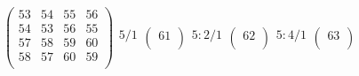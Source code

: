 \documentclass[12pt,a4paper]{amsart}
\begin{document}
\begin{align*}
\begin{array}{r}
\end{array}%
\left(\begin{array}{rr|rr}%
53&54&55&56\\%
54&53&56&55\\\hline%
57&58&59&60\\%
58&57&60&59\\%
\end{array}\right)%
\begin{array}{r}%
5/1 \\%
\end{array}%
\left(\begin{array}{r}%
61\\%
\end{array}\right)%
\begin{array}{r}%
5:2/1\\%
\end{array}%
\left(\begin{array}{r}%
62\\%
\end{array}\right)%
\begin{array}{r}%
5:4/1\\%
\end{array}%
\left(\begin{array}{r}%
63\\%
\end{array}\right)%
\end{align*}
\end{document}
